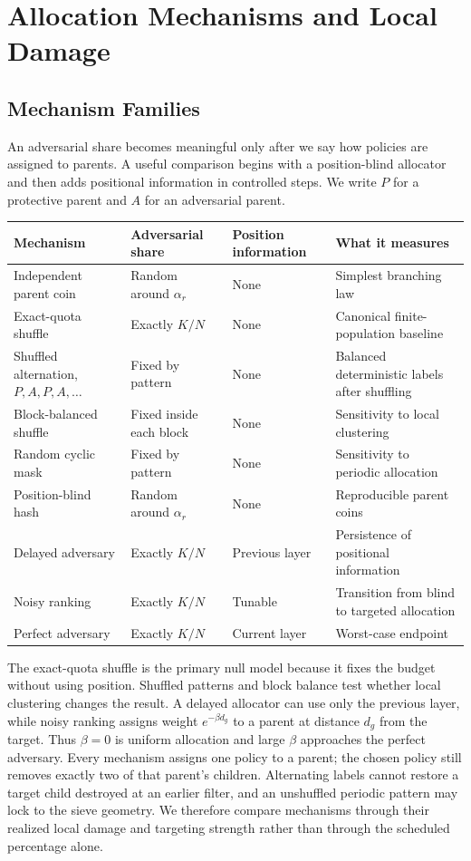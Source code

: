 \section{Allocation Mechanisms and Local Damage}
\subsection{Mechanism Families}
An adversarial share becomes meaningful only after we say how policies are assigned to parents. A useful comparison begins with a position-blind allocator and then adds positional information in controlled steps. We write $P$ for a protective parent and $A$ for an adversarial parent.
\begin{longtable}{@{}>{\raggedright\arraybackslash}p{}>{\raggedright\arraybackslash}p{}>{\raggedright\arraybackslash}p{}>{\raggedright\arraybackslash}p{}@{}}
\toprule
Mechanism & Adversarial share & Position information & What it measures \\
\midrule
Independent parent coin & Random around $\alpha_r$ & None & Simplest branching law \\
Exact-quota shuffle & Exactly $K/N$ & None & Canonical finite-population baseline \\
Shuffled alternation, $P,A,P,A,\ldots$ & Fixed by pattern & None & Balanced deterministic labels after shuffling \\
Block-balanced shuffle & Fixed inside each block & None & Sensitivity to local clustering \\
Random cyclic mask & Fixed by pattern & None & Sensitivity to periodic allocation \\
Position-blind hash & Random around $\alpha_r$ & None & Reproducible parent coins \\
Delayed adversary & Exactly $K/N$ & Previous layer & Persistence of positional information \\
Noisy ranking & Exactly $K/N$ & Tunable & Transition from blind to targeted allocation \\
Perfect adversary & Exactly $K/N$ & Current layer & Worst-case endpoint \\
\bottomrule
\end{longtable}
The exact-quota shuffle is the primary null model because it fixes the budget without using position. Shuffled patterns and block balance test whether local clustering changes the result. A delayed allocator can use only the previous layer, while noisy ranking assigns weight $e^{-\beta d_g}$ to a parent at distance $d_g$ from the target. Thus $\beta=0$ is uniform allocation and large $\beta$ approaches the perfect adversary.
Every mechanism assigns one policy to a parent; the chosen policy still removes exactly two of that parent's children. Alternating labels cannot restore a target child destroyed at an earlier filter, and an unshuffled periodic pattern may lock to the sieve geometry. We therefore compare mechanisms through their realized local damage and targeting strength rather than through the scheduled percentage alone.
